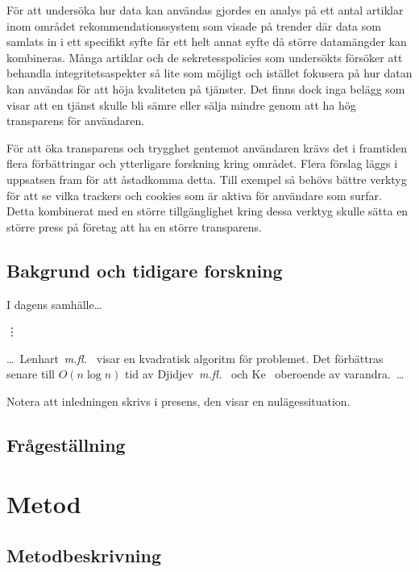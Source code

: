 \documentclass[a4paper,11pt]{article}
\begin{document}
{För att undersöka hur data kan användas gjordes en analys på ett antal artiklar inom området rekommendationssystem som visade på trender där data som samlats in i ett specifikt syfte får ett helt annat syfte då större datamängder kan kombineras. Många artiklar och de sekretesspolicies som undersökts försöker att behandla integritetsaspekter så lite som möjligt och istället fokusera på hur datan kan användas för att höja kvaliteten på tjänster. Det finns dock inga belägg som visar att en tjänst skulle bli sämre eller sälja mindre genom att ha hög transparens för användaren.

För att öka transparens och trygghet gentemot användaren krävs det i framtiden flera förbättringar och ytterligare forskning kring området. Flera förslag läggs i uppsatsen fram för att åstadkomma detta. Till exempel så behövs bättre verktyg för att se vilka trackers och cookies som är aktiva för användare som surfar. Detta kombinerat med en större tillgänglighet kring dessa verktyg skulle sätta en större press på företag att ha en större transparens. 






\newpage

\newpage
\subsection{Bakgrund och tidigare forskning}

I dagens samhälle\ldots

\vdots

\ldots\ Lenhart~{\em m.fl.}~\cite{rectlinkfirst} visar en
kvadratisk algoritm för problemet. Det förbättras senare till $O(n\log n)$ tid av
Djidjev~{\em m.fl.}~\cite{rectlinkopt1} och Ke~\cite{rectlinkopt2} oberoende av varandra.~\ldots

Notera att inledningen skrivs i presens, den visar en nulägessituation.


\subsection{Frågeställning}

\section{Metod}

\subsection{Metodbeskrivning}

}
\end{document}
